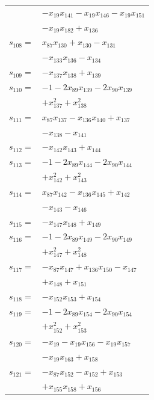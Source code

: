 \begin{longtable}{@{}r@{\;}l@{}}
 & \(\displaystyle -x_{19}x_{141} -x_{19}x_{146} -x_{19}x_{151}\) \\
 & \(\displaystyle -x_{19}x_{182} +x_{136}\) \\[3pt]
\(s_{108}=\) & \(\displaystyle x_{87}x_{130} +x_{130} -x_{131}\) \\
 & \(\displaystyle -x_{133}x_{136} -x_{134}\) \\[3pt]
\(s_{109}=\) & \(\displaystyle -x_{137}x_{138} +x_{139}\) \\[3pt]
\(s_{110}=\) & \(\displaystyle -1 -2x_{89}x_{139} -2x_{90}x_{139}\) \\
 & \(\displaystyle +x_{137}^{2} +x_{138}^{2}\) \\[3pt]
\(s_{111}=\) & \(\displaystyle x_{87}x_{137} -x_{136}x_{140} +x_{137}\) \\
 & \(\displaystyle -x_{138} -x_{141}\) \\[3pt]
\(s_{112}=\) & \(\displaystyle -x_{142}x_{143} +x_{144}\) \\[3pt]
\(s_{113}=\) & \(\displaystyle -1 -2x_{89}x_{144} -2x_{90}x_{144}\) \\
 & \(\displaystyle +x_{142}^{2} +x_{143}^{2}\) \\[3pt]
\(s_{114}=\) & \(\displaystyle x_{87}x_{142} -x_{136}x_{145} +x_{142}\) \\
 & \(\displaystyle -x_{143} -x_{146}\) \\[3pt]
\(s_{115}=\) & \(\displaystyle -x_{147}x_{148} +x_{149}\) \\[3pt]
\(s_{116}=\) & \(\displaystyle -1 -2x_{89}x_{149} -2x_{90}x_{149}\) \\
 & \(\displaystyle +x_{147}^{2} +x_{148}^{2}\) \\[3pt]
\(s_{117}=\) & \(\displaystyle -x_{87}x_{147} +x_{136}x_{150} -x_{147}\) \\
 & \(\displaystyle +x_{148} +x_{151}\) \\[3pt]
\(s_{118}=\) & \(\displaystyle -x_{152}x_{153} +x_{154}\) \\[3pt]
\(s_{119}=\) & \(\displaystyle -1 -2x_{89}x_{154} -2x_{90}x_{154}\) \\
 & \(\displaystyle +x_{152}^{2} +x_{153}^{2}\) \\[3pt]
\(s_{120}=\) & \(\displaystyle -x_{19} -x_{19}x_{156} -x_{19}x_{157}\) \\
 & \(\displaystyle -x_{19}x_{163} +x_{158}\) \\[3pt]
\(s_{121}=\) & \(\displaystyle -x_{87}x_{152} -x_{152} +x_{153}\) \\
 & \(\displaystyle +x_{155}x_{158} +x_{156}\) \\[3pt]

\end{longtable}
